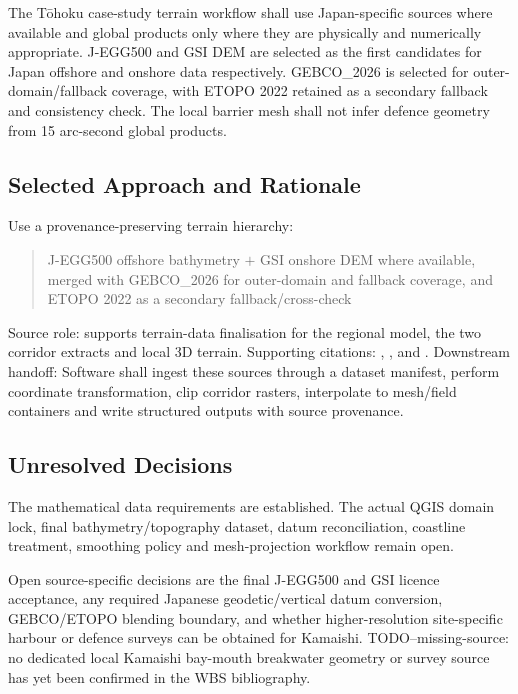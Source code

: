 The Tōhoku case-study terrain workflow shall use Japan-specific sources
where available and global products only where they are physically and
numerically appropriate. J-EGG500 and GSI DEM are selected as the
first candidates for Japan offshore and onshore data respectively.
GEBCO\_2026 is selected for outer-domain/fallback coverage, with ETOPO
2022 retained as a secondary fallback and consistency check. The local
barrier mesh shall not infer defence geometry from 15 arc-second global
products.

\subsection{Selected Approach and Rationale}
\label{sec:res-dat-geo-selected-approach}

Use a provenance-preserving terrain hierarchy:

\begin{quote}
  J-EGG500 offshore bathymetry $+$
  GSI onshore DEM where available, merged with GEBCO\_2026 for
  outer-domain and fallback coverage, and ETOPO 2022 as a secondary
  fallback/cross-check
\end{quote}

Source role: supports terrain-data finalisation for the regional model,
the two corridor extracts and local 3D terrain. Supporting citations:
\textcite{jodcJegg500}, \textcite{gsiDemDownload},
\textcite{gebco2026grid} and \textcite{noaa2022etopo}. Downstream
handoff: Software shall ingest these sources through a dataset
manifest, perform coordinate transformation, clip corridor rasters,
interpolate to mesh/field containers and write structured outputs with
source provenance.

\subsection{Unresolved Decisions}
\label{sec:res-dat-geo-unresolved-decisions}


The mathematical data requirements are established. The actual QGIS
domain lock, final bathymetry/topography dataset, datum reconciliation,
coastline treatment, smoothing policy and mesh-projection workflow
remain open.

Open source-specific decisions are the final J-EGG500 and GSI licence
acceptance, any required Japanese geodetic/vertical datum conversion,
GEBCO/ETOPO blending boundary, and whether higher-resolution
site-specific harbour or defence surveys can be obtained for Kamaishi.
TODO--missing-source: no dedicated local Kamaishi bay-mouth breakwater
geometry or survey source has yet been confirmed in the WBS
bibliography.


